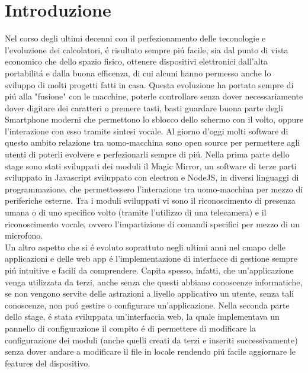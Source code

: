 \chapter*{Introduzione}

Nel corso degli ultimi decenni con il perfezionamento delle teconologie e l'evoluzione dei
calcolatori, \'e risultato sempre pi\'u facile, sia dal punto di vista economico che dello spazio fisico,
ottenere dispositivi elettronici dall'alta portabilit\'a e dalla buona efficenza, di cui
alcuni hanno permesso anche lo sviluppo di molti progetti fatti in casa.
Questa evoluzione ha portato sempre di pi\'u alla "fusione" con le macchine, poterle controllare senza
dover necessariamente dover digitare dei caratteri o premere tasti,
basti guardare buona parte degli Smartphone moderni che permettono lo sblocco dello schermo con
il volto, oppure l'interazione con esso tramite sintesi vocale.
Al giorno d'oggi molti software di questo ambito relazione tra uomo-macchina
sono open source per permettere agli utenti di poterli evolvere e perfezionarli sempre di pi\'u.
Nella prima parte dello stage sono stati sviluppati dei moduli il Magic Mirror, un software
di terze parti sviluppato in Javascript sviluppato con electron e NodeJS,
in diversi linguaggi di programmazione, che permettessero l'interazione tra uomo-macchina per
mezzo di periferiche esterne.
Tra i moduli sviluppati vi sono il riconoscimento di presenza umana o di uno
specifico volto (tramite l'utilizzo di una telecamera) e il riconoscimento
vocale, ovvero l'impartizione di comandi specifici per mezzo di un microfono.
\\[2\baselineskip]
Un altro aspetto che si \'e evoluto soprattuto negli ultimi anni nel cmapo
delle applicazioni e delle web app \'e l'implementazione di interfacce di gestione sempre pi\'u
intuitive e facili da comprendere. Capita spesso, infatti, che un'applicazione
venga utilizzata da terzi, anche senza che questi abbiano conoscenze informatiche,
se non vengono servite delle astrazioni a livello applicativo un utente, senza
tali conoscenze, non pu\'o gestire o configurare un'applicazione.
Nella seconda parte dello stage,
\'e stata sviluppata un'interfaccia web, la quale implementava un pannello di configurazione
il compito \'e di permettere di modificare la configurazione
dei moduli (anche quelli creati da terzi e inseriti successivamente) senza dover andare a modificare il
file in locale rendendo pi\'u facile aggiornare le features del dispositivo.
